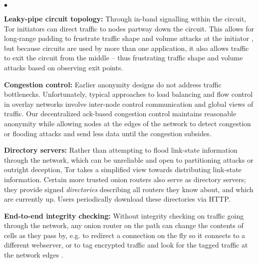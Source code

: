\documentclass[times,10pt,twocolumn]{article}
\newenvironment{tightlist}{\begin{list}{$\bullet$}{
  \setlength{\itemsep}{0mm}
    \setlength{\parsep}{0mm}
    }}{\end{list}}
\begin{document}
\begin{tightlist}
\item \textbf{Leaky-pipe circuit topology:} Through in-band
  signalling within the
  circuit, Tor initiators can direct traffic to nodes partway down the
  circuit. This allows for long-range padding to frustrate traffic
  shape and volume attacks at the initiator \cite{defensive-dropping},
  but because circuits are used by more than one application, it also
  allows traffic to exit the circuit from the middle -- thus
  frustrating traffic shape and volume attacks based on observing exit
  points.

\item \textbf{Congestion control:} Earlier anonymity designs do not
address traffic bottlenecks. Unfortunately, typical approaches to load
balancing and flow control in overlay networks involve inter-node control
communication and global views of traffic. Our decentralized ack-based
congestion control maintains reasonable anonymity while allowing nodes
at the edges of the network to detect congestion or flooding attacks
and send less data until the congestion subsides.

\item \textbf{Directory servers:} Rather than attempting to flood
link-state information through the network, which can be unreliable and
open to partitioning attacks or outright deception, Tor takes a simplified
view towards distributing link-state information. Certain more trusted
onion routers also serve as directory servers; they provide signed
\emph{directories} describing all routers they know about, and which
are currently up. Users periodically download these directories via HTTP.

\item \textbf{End-to-end integrity checking:} Without integrity checking
on traffic going through the network, any onion router on the path
can change the contents of cells as they pass by, e.g. to redirect a
connection on the fly so it connects to a different webserver, or to
tag encrypted traffic and look for the tagged traffic at the network
edges \cite{minion-design}.


\end{tightlist}
\end{document}
